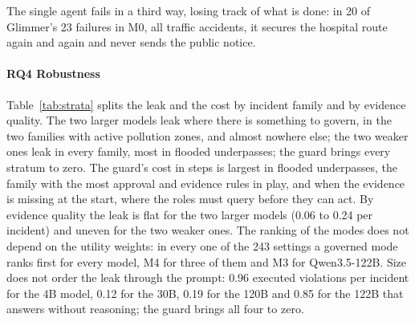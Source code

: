 \documentclass[10pt,conference]{IEEEtran}
\newcommand{\RQ}[1]{\textbf{RQ#1}}
\begin{document}
The single agent fails in a third way, losing track of what is done: in 20 of Glimmer's 23 failures in M0, all traffic accidents, it secures the hospital route again and again and never sends the public notice.

\paragraph{\RQ{4} Robustness}
Table~\ref{tab:strata} splits the leak and the cost by incident family and by evidence quality. The two larger models leak where there is something to govern, in the two families with active pollution zones, and almost nowhere else; the two weaker ones leak in every family, most in flooded underpasses; the guard brings every stratum to zero. The guard's cost in steps is largest in flooded underpasses, the family with the most approval and evidence rules in play, and when the evidence is missing at the start, where the roles must query before they can act. By evidence quality the leak is flat for the two larger models (0.06 to 0.24 per incident) and uneven for the two weaker ones.
 The ranking of the modes does not depend on the utility weights: in every one of the 243 settings a governed mode ranks first for every model, M4 for three of them and M3 for Qwen3.5-122B. Size does not order the leak through the prompt: 0.96 executed violations per incident for the 4B model, 0.12 for the 30B, 0.19 for the 120B and 0.85 for the 122B that answers without reasoning; the guard brings all four to zero.
\end{document}
